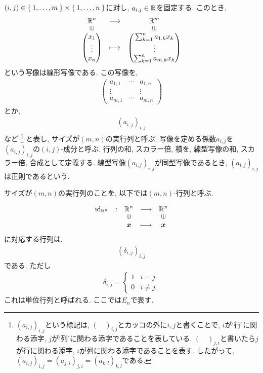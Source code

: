 \begin{definition}
$(i,j)\in\Set{1,\ldots,m}\times \Set{1,\ldots,n}$に対し,
$a_{i,j}\in\mathbb{R}$を固定する.
このとき,
\begin{align*}
  \Shazo{\RR^n}{\RR^m}
        {\begin{pmatrix}x_1\\\vdots\\x_n\end{pmatrix}}{\begin{pmatrix}\sum_{k=1}^n a_{1,k}x_k\\\vdots\\\sum_{k=1}^n a_{m,k}x_k\end{pmatrix}}
\end{align*}
という写像は線形写像である.
この写像を,
\begin{align*}
  \begin{pmatrix}
    a_{1,1}&\cdots &a_{1,n}\\
    \vdots& &\vdots\\
    a_{m,1}&\cdots &a_{m,n}
  \end{pmatrix}
\end{align*}
とか,
\begin{align*}
  (a_{i,j})_{i,j}
\end{align*}
など%
\footnote{$(a_{i,j})_{i,j}$という標記は, $(\quad)_{i,j}$とカッコの外に$i,j$と書くことで, $i$が`行'に関わる添字, $j$が`列'に関わる添字であることを表している.
$(\quad)_{j,i}$と書いたら$j$が行に関わる添字, $i$が列に関わる添字であることを表す.
したがって, $(a_{i,j})_{i,j}=(a_{j,i})_{j,i}=(a_{k,l})_{k,l}$である.}%
と表し,
サイズが$(m,n)$の実行列と呼ぶ.
写像を定める係数$a_{i,j}$を
$(a_{i,j})_{i,j}$の$(i,j)$-成分と呼ぶ.
行列の和, スカラー倍, 積を,
線型写像の和, スカラー倍, 合成として定義する.
線型写像$(a_{i,j})_{i,j}$が同型写像であるとき,
$(a_{i,j})_{i,j}$は正則であるという.
\end{definition}
\begin{remark}
  サイズが$(m,n)$の実行列のことを,
以下では$(m,n)$-行列と呼ぶ.
\end{remark}
\begin{remark}
  \begin{align*}
    \shazo{\id_{\RR^n}}
          {\RR^n}{\RR^n}
          {\xx}{\xx}
  \end{align*}
  に対応する行列は,
\begin{align*}
  (\delta_{i,j})_{i,j}
\end{align*}
である.
ただし
\begin{align*}
  \delta_{i,j}=
  \begin{cases}
    1&i=j\\
    0&i\neq j.
  \end{cases}
\end{align*}
これは単位行列と呼ばれる.
ここでは$E_n$で表す.
\end{remark}


